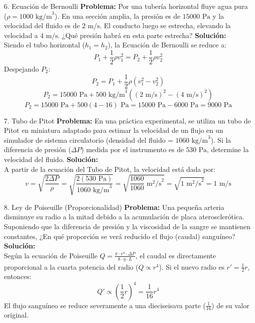 \documentclass[12pt,letterpaper]{article}
\begin{document}
\vspace{0.3cm}
\begin{infobox}{6. Ecuación de Bernoulli}
    \textbf{Problema:} Por una tubería horizontal fluye agua pura ($\rho = 1000 \text{ kg/m}^3$). En una sección amplia, la presión es de $15000 \text{ Pa}$ y la velocidad del fluido es de $2 \text{ m/s}$. El conducto luego se estrecha, elevando la velocidad a $4 \text{ m/s}$. ¿Qué presión habrá en esta parte estrecha?
    \tcblower
    \textbf{Solución:}\\
    Siendo el tubo horizontal ($h_1 = h_2$), la Ecuación de Bernoulli se reduce a:
    \[
    P_1 + \frac{1}{2}\rho v_1^2 = P_2 + \frac{1}{2}\rho v_2^2
    \]
    Despejando $P_2$:
    \[
    P_2 = P_1 + \frac{1}{2}\rho (v_1^2 - v_2^2)
    \]
    \[
    P_2 = 15000 \text{ Pa} + 500 \text{ kg/m}^3 ((2 \text{ m/s})^2 - (4 \text{ m/s})^2)
    \]
    \[
    P_2 = 15000 \text{ Pa} + 500 (4 - 16) \text{ Pa} = 15000 \text{ Pa} - 6000 \text{ Pa} = 9000 \text{ Pa}
    \]
\end{infobox}

\vspace{0.3cm}
\begin{infobox}{7. Tubo de Pitot}
    \textbf{Problema:} En una práctica experimental, se utiliza un tubo de Pitot en miniatura adaptado para estimar la velocidad de un flujo en un simulador de sistema circulatorio (densidad del fluido = $1060 \text{ kg/m}^3$). Si la diferencia de presión ($\Delta P$) medida por el instrumento es de $530 \text{ Pa}$, determine la velocidad del fluido.
    \tcblower
    \textbf{Solución:}\\
    A partir de la ecuación del Tubo de Pitot, la velocidad está dada por:
    \[
    v = \sqrt{\frac{2 \Delta P}{\rho}} = \sqrt{\frac{2(530 \text{ Pa})}{1060 \text{ kg/m}^3}} = \sqrt{\frac{1060}{1060} \text{ m}^2\text{/s}^2} = \sqrt{1 \text{ m}^2\text{/s}^2} = 1 \text{ m/s}
    \]
\end{infobox}

\vspace{0.3cm}
\begin{infobox}{8. Ley de Poiseuille (Proporcionalidad)}
    \textbf{Problema:} Una pequeña arteria disminuye su radio a la mitad debido a la acumulación de placa aterosclerótica. Suponiendo que la diferencia de presión y la viscosidad de la sangre se mantienen constantes, ¿En qué proporción se verá reducido el flujo (caudal) sanguíneo?
    \tcblower
    \textbf{Solución:}\\
    Según la ecuación de Poiseuille $Q = \frac{\pi \cdot r^4 \cdot \Delta P}{8 \cdot \eta \cdot L}$, el caudal es directamente proporcional a la cuarta potencia del radio ($Q \propto r^4$). Si el nuevo radio es $r' = \frac{1}{2}r$, entonces:
    \[
    Q' \propto \left(\frac{1}{2}r\right)^4 = \frac{1}{16} r^4
    \]
    El flujo sanguíneo se reduce severamente a una dieciseisava parte ($\frac{1}{16}$) de su valor original.
\end{infobox}
\end{document}
